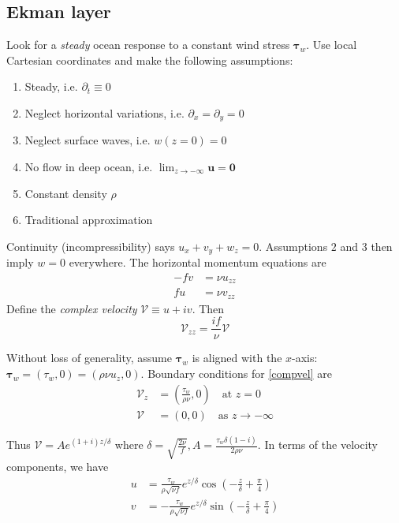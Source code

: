 \documentclass{jknotes}
\begin{document}
\subsection{Ekman layer}
Look for a \emph{steady} ocean response to a constant wind stress
$\bm{\tau}_w$. Use local Cartesian coordinates and make the following assumptions:
\begin{enumerate}
	\item Steady, i.e. $\partial_t \equiv 0$
	\item Neglect horizontal variations, i.e. $\partial_x = \partial_y = 0$
	\item Neglect surface waves, i.e. $w(z=0) = 0$
	\item No flow in deep ocean, i.e. $\lim_{z \to -\infty} \bm{u} = \bm{0}$
	\item Constant density $\rho$
	\item Traditional approximation
\end{enumerate}

Continuity (incompressibility) says $u_x + v_y + w_z = 0$. Assumptions $2$ and
$3$ then imply $w = 0$ everywhere. The horizontal momentum equations are
\begin{align}
	-fv &= \nu u_{zz} \label{hmom1} \\
	fu &= \nu v_{zz} \label{hmom2}
\end{align}
Define the \emph{complex velocity} $\mathcal{V} \equiv u+iv$. Then
\begin{equation}
	\mathcal{V}_{zz} = \frac{if}{\nu} \mathcal{V} \label{compvel}
\end{equation}

Without loss of generality, assume $\bm{\tau}_w$ is aligned with the $x$-axis:
$\bm{\tau}_w = (\tau_w, 0) = (\rho \nu u_z, 0)$. Boundary conditions for
\eqref{compvel} are
\begin{equation}
	\begin{aligned}
		\mathcal{V}_z &= \left( \frac{\tau_w}{\rho \nu}, 0\right) \hspace{1em}
		\text{at} \, \, z = 0 \\
		\mathcal{V} &= (0,0) \hspace{1em} \text{as}\,\, z \to -\infty
	\end{aligned}
\end{equation}

Thus $\mathcal{V} = Ae^{(1+i)z/\delta}$ where $\delta = \sqrt{\frac{2\nu}{f}},
A = \frac{\tau_w \delta (1-i)}{2 \rho \nu}$. In terms of the velocity
components, we have
\begin{equation}
	\begin{aligned}
		u &= \frac{\tau_w}{\rho \sqrt{\nu f}} e^{z/\delta} \cos \left(
		-\frac{z}{\delta} + \frac{\pi}{4}\right) \\
		v &= -\frac{\tau_w}{\rho \sqrt{\nu f}} e^{z/\delta} \sin \left(
		-\frac{z}{\delta} + \frac{\pi}{4}\right) \\
	\end{aligned}
\end{equation}
\end{document}
